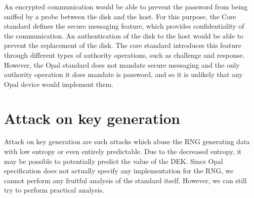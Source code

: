 An encrypted communication would be able to prevent the password from being sniffed by a probe between the disk and the host. For this purpose, the Core standard defines the secure messaging feature, which provides confidentiality of the communication.
An authentication of the disk to the host would be able to prevent the replacement of the disk. 
The core standard introduces this feature through different types of authority operations, such as challenge and response.
However, the Opal standard does not mandate secure messaging and the only authority operation it does mandate is password, and so it is unlikely that any Opal device would implement them.










\section{Attack on key generation}
\label{attack_rng}

Attack on key generation are such attacks which abuse the RNG generating data with low entropy or even entirely predictable. Due to the decreased entropy, it may be possible to potentially predict the value of the DEK.
Since Opal specification does not actually specify any implementation for the RNG, we cannot perform any fruitful analysis of the standard itself. However, we can still try to perform practical analysis.


